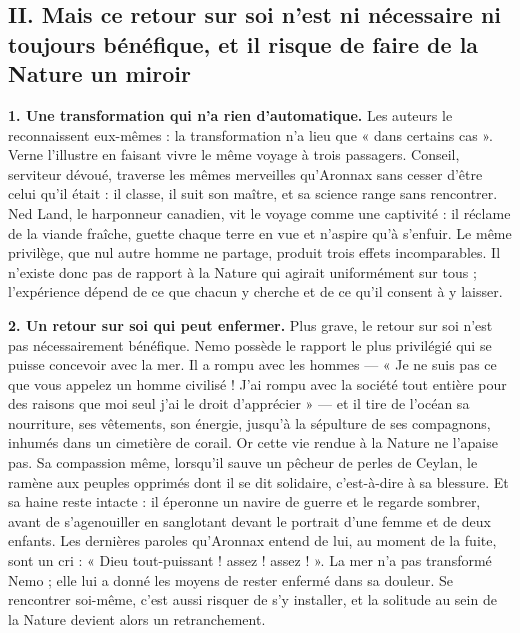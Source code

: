 \documentclass[11pt,a4paper]{article}
\begin{document}
\hypertarget{ii.-mais-ce-retour-sur-soi-nest-ni-nuxe9cessaire-ni-toujours-buxe9nuxe9fique-et-il-risque-de-faire-de-la-nature-un-miroir}{%
\subsection{II. Mais ce retour sur soi n'est ni nécessaire ni toujours bénéfique, et il risque de faire de la Nature un miroir}\label{ii.-mais-ce-retour-sur-soi-nest-ni-nuxe9cessaire-ni-toujours-buxe9nuxe9fique-et-il-risque-de-faire-de-la-nature-un-miroir}}

\textbf{1. Une transformation qui n'a rien d'automatique.} Les auteurs le reconnaissent eux-mêmes : la transformation n'a lieu que « dans certains cas ». Verne l'illustre en faisant vivre le même voyage à trois passagers. Conseil, serviteur dévoué, traverse les mêmes merveilles qu'Aronnax sans cesser d'être celui qu'il était : il classe, il suit son maître, et sa science range sans rencontrer. Ned Land, le harponneur canadien, vit le voyage comme une captivité : il réclame de la viande fraîche, guette chaque terre en vue et n'aspire qu'à s'enfuir. Le même privilège, que nul autre homme ne partage, produit trois effets incomparables. Il n'existe donc pas de rapport à la Nature qui agirait uniformément sur tous ; l'expérience dépend de ce que chacun y cherche et de ce qu'il consent à y laisser.

\textbf{2. Un retour sur soi qui peut enfermer.} Plus grave, le retour sur soi n'est pas nécessairement bénéfique. Nemo possède le rapport le plus privilégié qui se puisse concevoir avec la mer. Il a rompu avec les hommes --- « Je ne suis pas ce que vous appelez un homme civilisé ! J'ai rompu avec la société tout entière pour des raisons que moi seul j'ai le droit d'apprécier » --- et il tire de l'océan sa nourriture, ses vêtements, son énergie, jusqu'à la sépulture de ses compagnons, inhumés dans un cimetière de corail. Or cette vie rendue à la Nature ne l'apaise pas. Sa compassion même, lorsqu'il sauve un pêcheur de perles de Ceylan, le ramène aux peuples opprimés dont il se dit solidaire, c'est-à-dire à sa blessure. Et sa haine reste intacte : il éperonne un navire de guerre et le regarde sombrer, avant de s'agenouiller en sanglotant devant le portrait d'une femme et de deux enfants. Les dernières paroles qu'Aronnax entend de lui, au moment de la fuite, sont un cri : « Dieu tout-puissant ! assez ! assez ! ». La mer n'a pas transformé Nemo ; elle lui a donné les moyens de rester enfermé dans sa douleur. Se rencontrer soi-même, c'est aussi risquer de s'y installer, et la solitude au sein de la Nature devient alors un retranchement.
\end{document}
